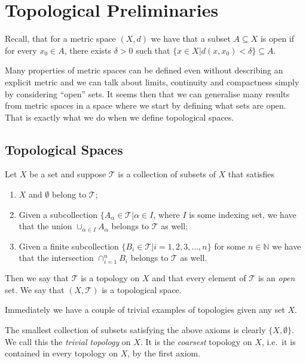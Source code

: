 \section{Topological Preliminaries}
\label{sec:prelims}

Recall, that for a metric space $(X,d)$ we have that a subset $A
\subseteq X$ is open if for every $x_0 \in A$, there exists $\delta >
0$ such that $\{x \in X | d(x,x_0) < \delta\} \subseteq A$.

Many properties of metric spaces can be defined even without
describing an explicit metric and we can talk about limits, continuity
and compactness simply by considering ``open'' sets. It seems then
that we can generalise many results from metric spaces in a space
where we start by defining what sets are open. That is exactly what we
do when we define topological spaces.

\subsection{Topological Spaces}
\label{sec:prelims:topospace}

\begin{defn}
  Let $X$ be a set and suppose $\mathscr{T}$ is a collection of
  subsets of $X$ that satisfies
  \begin{enumerate}
  \item $X$ and $\emptyset$ belong to $\mathscr{T}$;
  \item Given a subcollection $\{A_\alpha \in \mathscr{T} | \alpha \in
    I$, where $I$ is some indexing set, we have that the union
    $\cup_{\alpha \in I}A_\alpha$ belongs to $\mathscr{T}$ as well;
  \item Given a finite subcollection $\{B_i \in \mathscr{T} | i =
    1,2,3,\dots, n \}$ for some $n \in \mathbb{N}$ we have that the
    intersection $\cap_{i = 1}^{n} B_i$ belongs to $\mathscr{T}$ as well.
  \end{enumerate}
  Then we say that $\mathscr{T}$ is a topology on $X$ and that every
  element of $\mathscr{T}$ is an \emph{open} set. We say that
  $(X,\mathscr{T})$ is a topological space.
\end{defn}

Immediately we have a couple of trivial examples of topologies given
any set $X$.

\begin{exmp}
  \label{exmp:trivial}
  The smallest collection of subsets satisfying the above axioms is
  clearly $\{ X, \emptyset \}$. We call this the \emph{trivial
    topology} on $X$. It is the \emph{coarsest} topology on $X$, i.e.\
  it is contained in every topology on $X$, by the first axiom.
\end{exmp}


